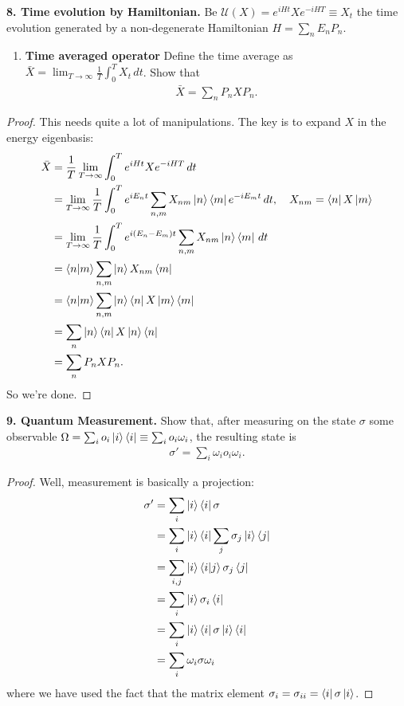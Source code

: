 \documentclass{book}
\theoremstyle{definition}
\newcommand{\nn}{\nonumber}
\newcommand{\f}[2]{\frac{#1}{#2}}
\begin{document}
\noindent \textbf{8. Time evolution by Hamiltonian.} Be $\mathcal{U}(X) = e^{iHt} X e^{-iHT} \equiv X_t$ the time evolution generated by a non-degenerate Hamiltonian $H = \sum_n E_n P_n$.
\begin{enumerate}
	\item \textbf{Time averaged operator}
	Define the time average as $\bar{X} = \lim_{T\to \infty} \f{1}{T} \int^T_0 X_t\,dt$. Show that
	\begin{align}
	\bar{X} = \sum_n P_n X P_n.
	\end{align}
\end{enumerate}
\begin{proof}
	This needs quite a lot of manipulations. The key is to expand $X$ in the energy eigenbasis:
	\begin{align}
	\bar{X} &= \f{1}{T}\lim_{T\to \infty}\int_0^T e^{iHt} X e^{-iHT}\,dt\nn\\
	&= \lim_{T\to \infty}\f{1}{T}\int_0^T e^{iE_nt} \sum_{n,m} X_{nm} \ket{n}\bra{m} e^{-iE_mt}\,dt, \quad X_{nm} = \bra{n} X \ket{m}  \nn\\
	&= \lim_{T\to \infty}\f{1}{T}\int_0^T e^{i(E_n-E_m)t} \sum_{n,m} X_{nm} \ket{n}\bra{m}\,dt\nn\\
	&= \braket{n}{m}\sum_{n,m} \ket{n}X_{nm}\bra{m}\nn\\
	&= \braket{n}{m}\sum_{n,m} \ket{n}\bra{n} X \ket{m}\bra{m}\nn\\
	&= \sum_n \ket{n} \bra{n} X \ket{n}\bra{n}\nn\\
	&= \sum_n P_n X P_n.
	\end{align}
	So we're done. 
\end{proof}



\noindent \textbf{9. Quantum Measurement.} Show that, after measuring on the state $\sigma$ some observable $\Omega = \sum_i o_i \ket{i}\bra{i} \equiv \sum_i o_i \omega_i$, the resulting state is 
\begin{align}
\sigma' = \sum_i \omega_i o_i \omega_i.
\end{align}
\begin{proof}
	Well, measurement is basically a projection:
	\begin{align}
	\sigma' &= \sum_i \ket{i}\bra{i}\sigma \nn\\
	&= \sum_i \ket{i}\bra{i}\sum_j \sigma_j \ket{i}\bra{j}\nn\\
	&= \sum_{i,j}\ket{i}\bra{i} \ket{j} \sigma_j \bra{j}\nn\\
	&= \sum_i \ket{i} \sigma_i \bra{i}\nn\\
	&= \sum_i \ket{i} \bra{i} \sigma \ket{i}\bra{i}\nn\\
	&= \sum_i \omega_i \sigma \omega_i
	\end{align}
	where we have used the fact that the matrix element $\sigma_i = \sigma_{ii} = \bra{i}\sigma\ket{i}$.
\end{proof}
\end{document}
